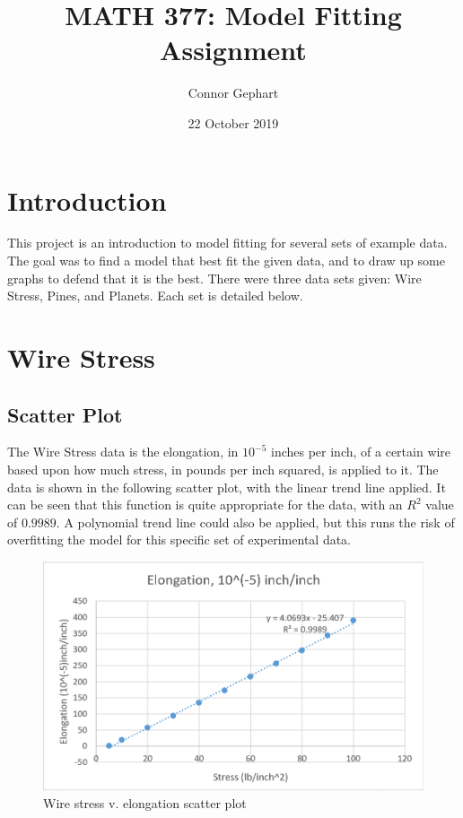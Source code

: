 \documentclass[12pt]{extarticle}
\title{MATH 377: Model Fitting Assignment}
\author{Connor Gephart}
\date{22 October 2019}
\begin{document}
\maketitle
\section{Introduction}
This project is an introduction to model fitting for several sets of example data. The goal was to find a model that best fit the given data, and to draw up some graphs to defend that it is the best. There were three data sets given: Wire Stress, Pines, and Planets. Each set is detailed below. 

\section{Wire Stress}
\subsection{Scatter Plot}
The Wire Stress data is the elongation, in $10^{-5}$ inches per inch, of a certain wire based upon how much stress, in pounds per inch squared, is applied to it. The data is shown in the following scatter plot, with the linear trend line applied. It can be seen that this function is quite appropriate for the data, with an $R^2$ value of $0.9989$. A polynomial trend line could also be applied, but this runs the risk of overfitting the model for this specific set of experimental data. 
\newpage
\begin{figure}[ht!]
  \includegraphics[width=\linewidth]{ElongationScatter.PNG}
  \caption{Wire stress v. elongation scatter plot}
\end{figure}
\newpage
\end{document}

